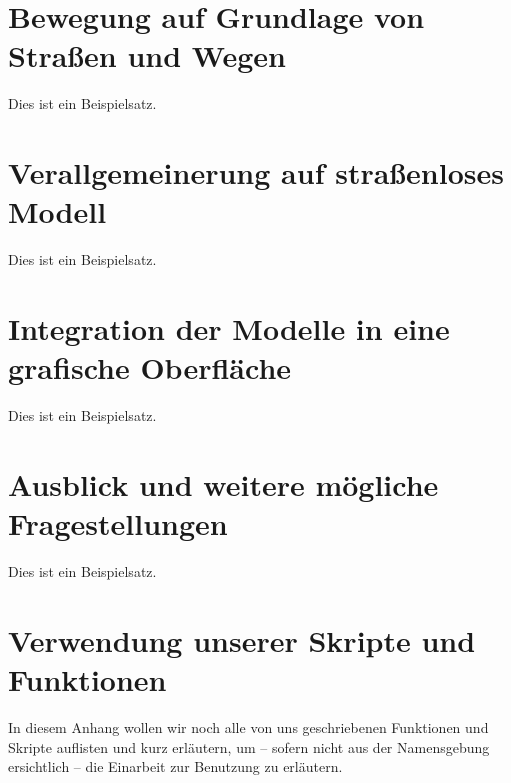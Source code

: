 \documentclass[
    paper=a4,
    DIV14,
    fontsize=12pt,
    pagesize=pdftex,
    toc=bibliographynumbered
]{scrartcl}
\numberwithin{figure}{section}
\numberwithin{equation}{section}
\numberwithin{table}{section}
\begin{document}
\section{Bewegung auf Grundlage von Straßen und Wegen}

Dies ist ein Beispielsatz.

\section{Verallgemeinerung auf straßenloses Modell}

Dies ist ein Beispielsatz.

\section{Integration der Modelle in eine grafische Oberfläche}

Dies ist ein Beispielsatz.

\section{Ausblick und weitere mögliche Fragestellungen}

Dies ist ein Beispielsatz.

\appendix
\section{Verwendung unserer Skripte und Funktionen}
In diesem Anhang wollen wir noch alle von uns geschriebenen Funktionen und Skripte
auflisten und kurz erläutern, um -- sofern nicht aus der Namensgebung ersichtlich -- die
Einarbeit zur Benutzung zu erläutern.
\end{document}

